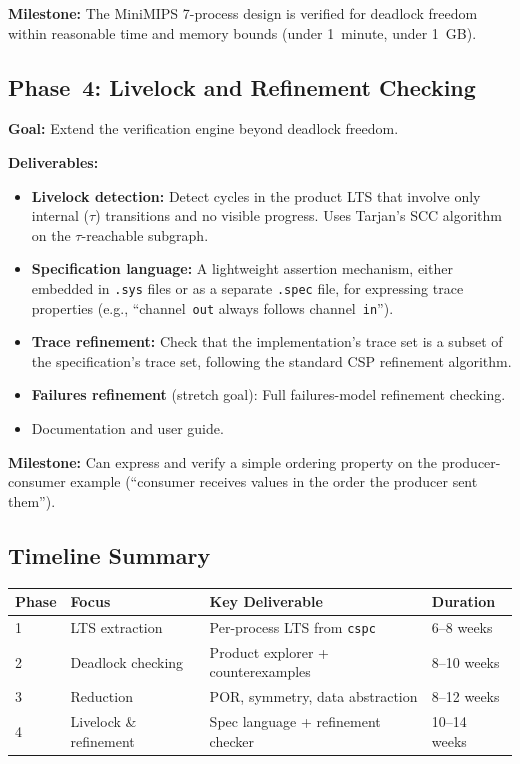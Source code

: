 \documentclass[11pt]{article}
\begin{document}
\textbf{Milestone:} The MiniMIPS 7-process design is verified for
deadlock freedom within reasonable time and memory bounds (under
1~minute, under 1~GB).

\subsection{Phase~4: Livelock and Refinement Checking}

\textbf{Goal:} Extend the verification engine beyond deadlock freedom.

\textbf{Deliverables:}
\begin{itemize}
\item \textbf{Livelock detection:} Detect cycles in the product LTS
  that involve only internal ($\tau$) transitions and no visible
  progress.  Uses Tarjan's SCC algorithm on the $\tau$-reachable
  subgraph.
\item \textbf{Specification language:} A lightweight assertion
  mechanism, either embedded in \texttt{.sys} files or as a separate
  \texttt{.spec} file, for expressing trace properties (e.g.,
  ``channel~\texttt{out} always follows channel~\texttt{in}'').
\item \textbf{Trace refinement:} Check that the implementation's
  trace set is a subset of the specification's trace set, following
  the standard CSP refinement algorithm.
\item \textbf{Failures refinement} (stretch goal): Full
  failures-model refinement checking.
\item Documentation and user guide.
\end{itemize}

\textbf{Milestone:} Can express and verify a simple ordering property
on the producer-consumer example (``consumer receives values in the
order the producer sent them'').

\subsection{Timeline Summary}

\begin{center}
\begin{tabular}{llll}
\toprule
\textbf{Phase} & \textbf{Focus} & \textbf{Key Deliverable} & \textbf{Duration} \\
\midrule
1 & LTS extraction  & Per-process LTS from \texttt{cspc} & 6--8 weeks \\
2 & Deadlock checking & Product explorer + counterexamples & 8--10 weeks \\
3 & Reduction  & POR, symmetry, data abstraction & 8--12 weeks \\
4 & Livelock \& refinement & Spec language + refinement checker & 10--14 weeks \\
\bottomrule
\end{tabular}
\end{center}
\end{document}
